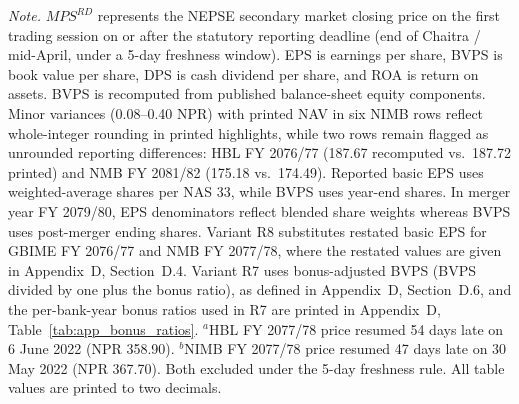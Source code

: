 \vspace{4pt}
\noindent\begin{minipage}{\linewidth}
\footnotesize
\textit{Note.} $\mathit{MPS}^{RD}$ represents the NEPSE secondary market closing price on the first trading session on or after the statutory reporting deadline (end of Chaitra / mid-April, under a 5-day freshness window). EPS is earnings per share, BVPS is book value per share, DPS is cash dividend per share, and ROA is return on assets. BVPS is recomputed from published balance-sheet equity components. Minor variances (0.08--0.40 NPR) with printed NAV in six NIMB rows reflect whole-integer rounding in printed highlights, while two rows remain flagged as unrounded reporting differences: HBL FY 2076/77 (187.67 recomputed vs.\ 187.72 printed) and NMB FY 2081/82 (175.18 vs.\ 174.49). Reported basic EPS uses weighted-average shares per NAS 33, while BVPS uses year-end shares. In merger year FY 2079/80, EPS denominators reflect blended share weights whereas BVPS uses post-merger ending shares. Variant R8 substitutes restated basic EPS for GBIME FY 2076/77 and NMB FY 2077/78, where the restated values are given in Appendix~D, Section~D.4. Variant R7 uses bonus-adjusted BVPS (BVPS divided by one plus the bonus ratio), as defined in Appendix~D, Section~D.6, and the per-bank-year bonus ratios used in R7 are printed in Appendix~D, Table~\ref{tab:app_bonus_ratios}. $^a$HBL FY 2077/78 price resumed 54 days late on 6 June 2022 (NPR 358.90). $^b$NIMB FY 2077/78 price resumed 47 days late on 30 May 2022 (NPR 367.70). Both excluded under the 5-day freshness rule. All table values are printed to two decimals.
\end{minipage}

